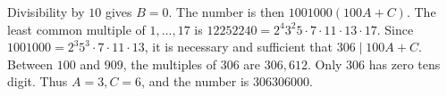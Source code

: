 Divisibility by $10$ gives $B=0$. The number is then $1001000(100A+C)$. The least common multiple of $1,\ldots,17$ is $12252240=2^4 3^2 5\cdot7\cdot11\cdot13\cdot17$. Since $1001000=2^3 5^3\cdot7\cdot11\cdot13$, it is necessary and sufficient that $306\mid100A+C$. Between $100$ and $909$, the multiples of $306$ are $306,612$. Only $306$ has zero tens digit. Thus $A=3,C=6$, and the number is $\boxed{306306000}$.
